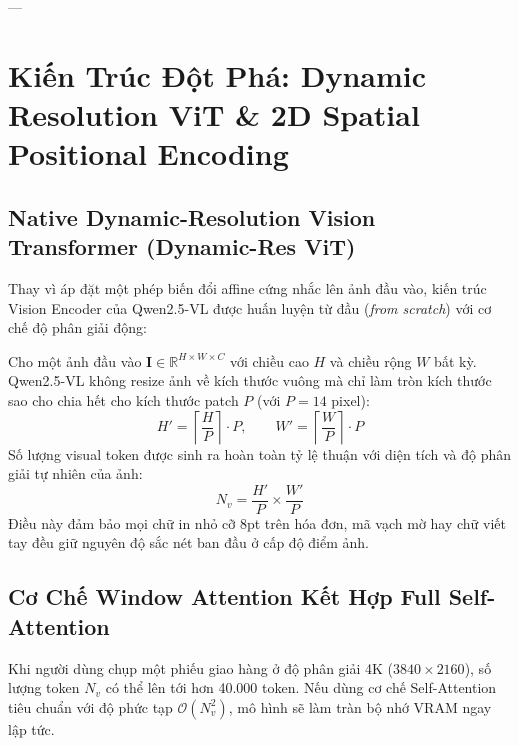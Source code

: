 \documentclass[11pt,a4paper]{article}
\begin{document}
---

\section{Kiến Trúc Đột Phá: Dynamic Resolution ViT \& 2D Spatial Positional Encoding}

\subsection{Native Dynamic-Resolution Vision Transformer (Dynamic-Res ViT)}

Thay vì áp đặt một phép biến đổi affine cứng nhắc lên ảnh đầu vào, kiến trúc Vision Encoder của Qwen2.5-VL được huấn luyện từ đầu (\textit{from scratch}) với cơ chế độ phân giải động:

\begin{formulationbox}
Cho một ảnh đầu vào $\mathbf{I} \in \mathbb{R}^{H \times W \times C}$ với chiều cao $H$ và chiều rộng $W$ bất kỳ. Qwen2.5-VL không resize ảnh về kích thước vuông mà chỉ làm tròn kích thước sao cho chia hết cho kích thước patch $P$ (với $P = 14$ pixel):
\begin{equation}
    H' = \left\lceil \frac{H}{P} \right\rceil \cdot P, \qquad W' = \left\lceil \frac{W}{P} \right\rceil \cdot P
\end{equation}
Số lượng visual token được sinh ra hoàn toàn tỷ lệ thuận với diện tích và độ phân giải tự nhiên của ảnh:
\begin{equation}
    N_v = \frac{H'}{P} \times \frac{W'}{P}
\end{equation}
Điều này đảm bảo mọi chữ in nhỏ cỡ 8pt trên hóa đơn, mã vạch mờ hay chữ viết tay đều giữ nguyên độ sắc nét ban đầu ở cấp độ điểm ảnh.
\end{formulationbox}

\subsection{Cơ Chế Window Attention Kết Hợp Full Self-Attention}

Khi người dùng chụp một phiếu giao hàng ở độ phân giải 4K ($3840 \times 2160$), số lượng token $N_v$ có thể lên tới hơn 40.000 token. Nếu dùng cơ chế Self-Attention tiêu chuẩn với độ phức tạp $\mathcal{O}(N_v^2)$, mô hình sẽ làm tràn bộ nhớ VRAM ngay lập tức.
\end{document}
